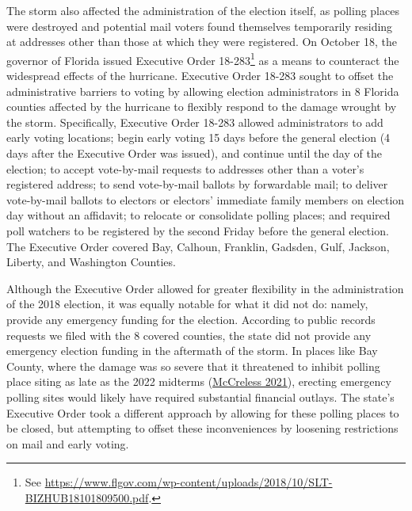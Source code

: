 \documentclass[
  12pt,
]{article}
\begin{document}
The storm also affected the administration of the election itself, as polling places were destroyed and potential mail voters found themselves temporarily residing at addresses other than those at which they were registered. On October 18, the governor of Florida issued Executive Order 18-283\footnote{See \url{https://www.flgov.com/wp-content/uploads/2018/10/SLT-BIZHUB18101809500.pdf}.} as a means to counteract the widespread effects of the hurricane. Executive Order 18-283 sought to offset the administrative barriers to voting by allowing election administrators in 8 Florida counties affected by the hurricane to flexibly respond to the damage wrought by the storm. Specifically, Executive Order 18-283 allowed administrators to add early voting locations; begin early voting 15 days before the general election (4 days after the Executive Order was issued), and continue until the day of the election; to accept vote-by-mail requests to addresses other than a voter's registered address; to send vote-by-mail ballots by forwardable mail; to deliver vote-by-mail ballots to electors or electors' immediate family members on election day without an affidavit; to relocate or consolidate polling places; and required poll watchers to be registered by the second Friday before the general election. The Executive Order covered Bay, Calhoun, Franklin, Gadsden, Gulf, Jackson, Liberty, and Washington Counties.

Although the Executive Order allowed for greater flexibility in the administration of the 2018 election, it was equally notable for what it did not do: namely, provide any emergency funding for the election. According to public records requests we filed with the 8 covered counties, the state did not provide any emergency election funding in the aftermath of the storm. In places like Bay County, where the damage was so severe that it threatened to inhibit polling place siting as late as the 2022 midterms (\protect\hyperlink{ref-McCreless2021}{McCreless 2021}), erecting emergency polling sites would likely have required substantial financial outlays. The state's Executive Order took a different approach by allowing for these polling places to be closed, but attempting to offset these inconveniences by loosening restrictions on mail and early voting.
\end{document}
